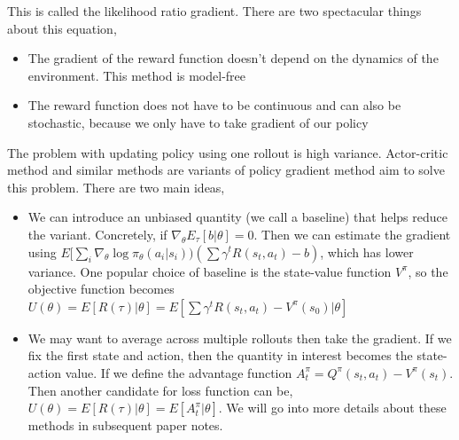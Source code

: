 \documentclass[graybox]{svmult}
\begin{document}
This is called the likelihood ratio gradient. There are two spectacular things about this equation,

\begin{itemize}
\item The gradient of the reward function doesn't depend on the dynamics of the environment. This method is model-free
\item The reward function does not have to be continuous and can also be stochastic, because we only have to take gradient of our policy
\end{itemize}

The problem with updating policy using one rollout is high variance. Actor-critic method and similar methods are variants of policy gradient method aim to solve this problem. There are two main ideas,

\begin{itemize}
\item We can introduce an unbiased quantity (we call a baseline) that helps reduce the variant. Concretely, if $\nabla_{\theta}E_{\tau}[b | \theta] = 0$. Then we can estimate the gradient using $E[ \sum_i \nabla_{\theta}  \log \pi_{\theta} (a_i | s_i)) (\sum \gamma^t R(s_t, a_t) - b) $, which has lower variance. One popular choice of baseline is the state-value function $V^{\pi}$, so the objective function becomes $U(\theta) = E[R(\tau) | \theta] = E[\sum \gamma^t R(s_t, a_t) - V^{\pi}(s_0)| \theta]$
\item We may want to average across multiple rollouts then take the gradient. If we fix the first state and action, then the quantity in interest becomes the state-action value. If we define the advantage function $A^{\pi}_t = Q^{\pi}(s_t, a_t) - V^{\pi}(s_t)$. Then another candidate for loss function can be,  $U(\theta) = E[R(\tau) | \theta] = E[A^{\pi}_t | \theta]$. We will go into more details about these methods in subsequent paper notes.
\end{itemize}
\end{document}
